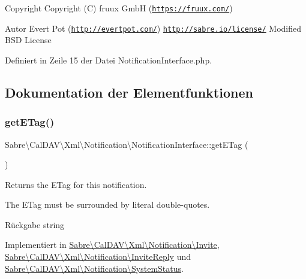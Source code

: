 \begin{DoxyCopyright}{Copyright}
Copyright (C) fruux GmbH (\href{https://fruux.com/}{\tt https\+://fruux.\+com/}) 
\end{DoxyCopyright}
\begin{DoxyAuthor}{Autor}
Evert Pot (\href{http://evertpot.com/}{\tt http\+://evertpot.\+com/})  \href{http://sabre.io/license/}{\tt http\+://sabre.\+io/license/} Modified B\+SD License 
\end{DoxyAuthor}


Definiert in Zeile 15 der Datei Notification\+Interface.\+php.



\subsection{Dokumentation der Elementfunktionen}
\mbox{\label{interface_sabre_1_1_cal_d_a_v_1_1_xml_1_1_notification_1_1_notification_interface_a5f87e03e47df0de258d637209fc906be}} 
\subsubsection{\texorpdfstring{get\+E\+Tag()}{getETag()}}
{\footnotesize\ttfamily Sabre\textbackslash{}\+Cal\+D\+A\+V\textbackslash{}\+Xml\textbackslash{}\+Notification\textbackslash{}\+Notification\+Interface\+::get\+E\+Tag (\begin{DoxyParamCaption}{ }\end{DoxyParamCaption})}

Returns the E\+Tag for this notification.

The E\+Tag must be surrounded by literal double-\/quotes.

\begin{DoxyReturn}{Rückgabe}
string 
\end{DoxyReturn}


Implementiert in \mbox{\hyperlink{class_sabre_1_1_cal_d_a_v_1_1_xml_1_1_notification_1_1_invite_a8d56779d8f2e8657cc7d5f1cd49af29e}{Sabre\textbackslash{}\+Cal\+D\+A\+V\textbackslash{}\+Xml\textbackslash{}\+Notification\textbackslash{}\+Invite}}, \mbox{\hyperlink{class_sabre_1_1_cal_d_a_v_1_1_xml_1_1_notification_1_1_invite_reply_a54973289592e7bc7ec95cc889e19d3e8}{Sabre\textbackslash{}\+Cal\+D\+A\+V\textbackslash{}\+Xml\textbackslash{}\+Notification\textbackslash{}\+Invite\+Reply}} und \mbox{\hyperlink{class_sabre_1_1_cal_d_a_v_1_1_xml_1_1_notification_1_1_system_status_a84961b05cc8106e15c3cab9d4c14f268}{Sabre\textbackslash{}\+Cal\+D\+A\+V\textbackslash{}\+Xml\textbackslash{}\+Notification\textbackslash{}\+System\+Status}}.

